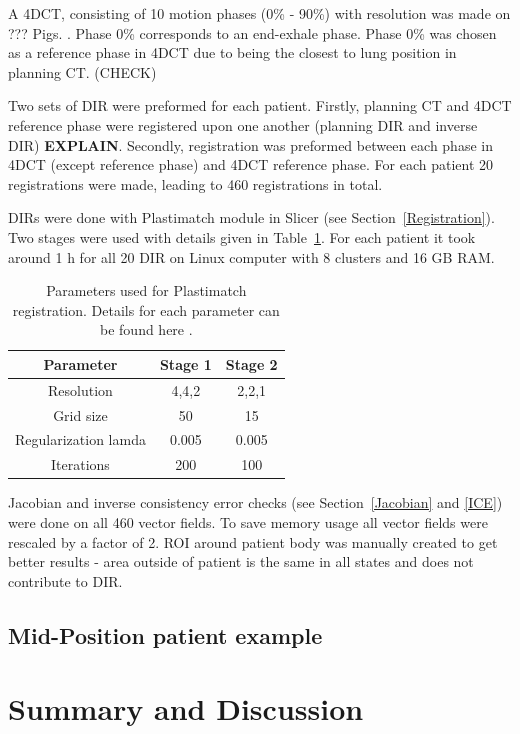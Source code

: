 \documentclass[type=dr, dr=rernat, accentcolor=tud7b,colorbacktitle, bigchapter, openright, twoside, 12pt ]{tudthesis}
\begin{document}
A 4DCT, consisting of 10 motion phases (0\% - 90\%) with resolution was made on ??? Pigs. .
Phase 0\% corresponds to an end-exhale phase. Phase 0\% was chosen as a reference phase in 4DCT due to being the closest to lung position in planning CT. (CHECK)

Two sets of DIR were preformed for each patient. Firstly, planning CT and 4DCT reference phase were registered upon one another (planning DIR and inverse DIR) \textbf{EXPLAIN}. Secondly, registration was preformed between each phase in 4DCT
(except reference phase) and 4DCT reference phase. For each patient 20 registrations were made, leading to 460 registrations in total.

DIRs were done with Plastimatch module in Slicer (see Section~\ref{Registration}). Two stages were used with details given in Table~\ref{tab:stages2}. For each patient it took around 1 h for all 20 DIR on Linux computer with 8 clusters and 16 GB RAM.

\begin{table}[H]
  \centering
  \caption{Parameters used for Plastimatch registration. Details for each parameter can be found here \cite{Plastimatch}.}
  \begin{tabular}{c|c|c}
      Parameter & Stage 1 & Stage 2 \\
      \hline
      Resolution & 4,4,2 & 2,2,1 \\
      Grid size & 50 & 15 \\
      Regularization lamda & 0.005 & 0.005 \\
      Iterations & 200 & 100 \\
    \hline\hline
  \end{tabular}
  \label{tab:stages2}
\end{table}

Jacobian and inverse consistency error checks (see Section~\ref{Jacobian} and \ref{ICE}) were done on all 460 vector fields. To save memory usage all vector fields were rescaled by a factor of 2. ROI around patient body was manually created to
get better results - area outside of patient is the same in all states and does not contribute to DIR.

\subsection{Mid-Position patient example}


\section{Summary and Discussion}





{}
% 
\end{document}
